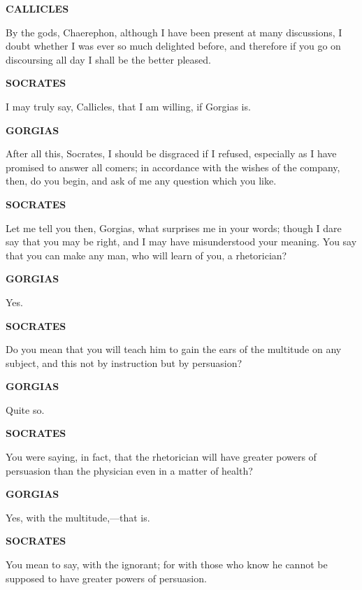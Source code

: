 \documentclass[11pt,letter]{article}
\begin{document}
\par \textbf{CALLICLES}
\par   By the gods, Chaerephon, although I have been present at many discussions, I doubt whether I was ever so much delighted before, and therefore if you go on discoursing all day I shall be the better pleased.

\par \textbf{SOCRATES}
\par   I may truly say, Callicles, that I am willing, if Gorgias is.

\par \textbf{GORGIAS}
\par   After all this, Socrates, I should be disgraced if I refused, especially as I have promised to answer all comers; in accordance with the wishes of the company, then, do you begin, and ask of me any question which you like.

\par \textbf{SOCRATES}
\par   Let me tell you then, Gorgias, what surprises me in your words; though I dare say that you may be right, and I may have misunderstood your meaning. You say that you can make any man, who will learn of you, a rhetorician?

\par \textbf{GORGIAS}
\par   Yes.

\par \textbf{SOCRATES}
\par   Do you mean that you will teach him to gain the ears of the multitude on any subject, and this not by instruction but by persuasion?

\par \textbf{GORGIAS}
\par   Quite so.

\par \textbf{SOCRATES}
\par   You were saying, in fact, that the rhetorician will have greater powers of persuasion than the physician even in a matter of health?

\par \textbf{GORGIAS}
\par   Yes, with the multitude,—that is.

\par \textbf{SOCRATES}
\par   You mean to say, with the ignorant; for with those who know he cannot be supposed to have greater powers of persuasion.
\end{document}
